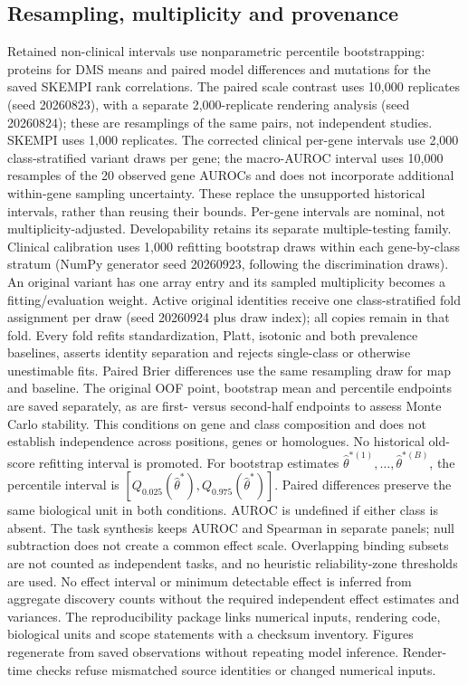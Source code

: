 \subsection{Resampling, multiplicity and provenance}
Retained non-clinical intervals use nonparametric percentile bootstrapping: proteins for DMS means and paired model differences and mutations for the saved SKEMPI rank correlations. The paired scale contrast uses 10,000 replicates (seed 20260823), with a separate 2,000-replicate rendering analysis (seed 20260824); these are resamplings of the same pairs, not independent studies. SKEMPI uses 1,000 replicates. The corrected clinical per-gene intervals use 2,000 class-stratified variant draws per gene; the macro-AUROC interval uses 10,000 resamples of the 20 observed gene AUROCs and does not incorporate additional within-gene sampling uncertainty. These replace the unsupported historical intervals, rather than reusing their bounds. Per-gene intervals are nominal, not multiplicity-adjusted. Developability retains its separate multiple-testing family.
Clinical calibration uses 1,000 refitting bootstrap draws within each gene-by-class stratum (NumPy generator seed 20260923, following the discrimination draws). An original variant has one array entry and its sampled multiplicity becomes a fitting/evaluation weight. Active original identities receive one class-stratified fold assignment per draw (seed 20260924 plus draw index); all copies remain in that fold. Every fold refits standardization, Platt, isotonic and both prevalence baselines, asserts identity separation and rejects single-class or otherwise unestimable fits. Paired Brier differences use the same resampling draw for map and baseline. The original OOF point, bootstrap mean and percentile endpoints are saved separately, as are first- versus second-half endpoints to assess Monte Carlo stability. This conditions on gene and class composition and does not establish independence across positions, genes or homologues. No historical old-score refitting interval is promoted.
For bootstrap estimates $\widehat\theta^{*(1)},\ldots,\widehat\theta^{*(B)}$, the percentile interval is $[Q_{0.025}(\widehat\theta^*),Q_{0.975}(\widehat\theta^*)]$. Paired differences preserve the same biological unit in both conditions. AUROC is undefined if either class is absent. The task synthesis keeps AUROC and Spearman in separate panels; null subtraction does not create a common effect scale. Overlapping binding subsets are not counted as independent tasks, and no heuristic reliability-zone thresholds are used. No effect interval or minimum detectable effect is inferred from aggregate discovery counts without the required independent effect estimates and variances.
The reproducibility package links numerical inputs, rendering code, biological units and scope statements with a checksum inventory. Figures regenerate from saved observations without repeating model inference. Render-time checks refuse mismatched source identities or changed numerical inputs.
